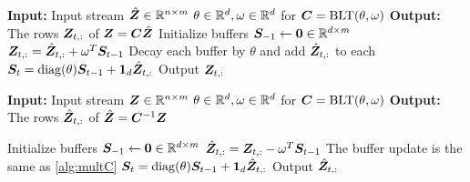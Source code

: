  \begin{minipage}[t]{0.49\textwidth}
\begin{algorithm}[H]
\caption{\small Stream Mult. by $\bltm(\theta, \omega)$~\citep{mcmahan2024efficient}} \label{alg:multC}
\begin{algorithmic}%
\STATE \textbf{Input:} 
\STATE \myind Input stream $\hat {{\bm{Z}}} \in \mathbb{R}^{n \times m}$
\STATE \myind $\theta \in \mathbb{R}^d, \omega \in \mathbb{R}^d$ for ${\bm{C}} = \text{BLT}(\theta, \omega)$
\STATE \textbf{Output:}
\STATE \myind The rows ${\bm{Z}}_{t, :}$ of ${\bm{Z}} = {\bm{C}} \hat {{\bm{Z}}}$
\STATE
\STATE Initialize buffers ${\bm{S}}_{-1} \leftarrow \mathbf{0} \in \mathbb{R}^{d \times m}$
  \STATE  ${\bm{Z}}_{t,:} = \hat{{\bm{Z}}}_{t,:} + \omega^T {\bm{S}}_{t-1}$ 
  \STATEComment Decay each buffer by $\theta$ and add $\hat{{\bm{Z}}}_{t,:}$ to each
  \STATE ${\bm{S}}_{t} = \operatorname{diag}(\theta) {\bm{S}}_{t-1}  + \bm{1}_d \hat{{\bm{Z}}}_{t,:}$
  \STATE Output ${\bm{Z}}_{t,:}$
\ENDFOR
\end{algorithmic}
\end{algorithm}
\end{minipage}
%
\hfill
%
\begin{minipage}[t]{0.49\textwidth}
\begin{algorithm}[H]
\caption{\small Stream Mult. by $\bltm^{-1}(\theta, \omega)$} \label{alg:multCinv}
\begin{algorithmic}%
\STATE \textbf{Input:} 
\STATE \myind Input stream ${\bm{Z}} \in \mathbb{R}^{n \times m}$
\STATE \myind $\theta \in \mathbb{R}^d, \omega \in \mathbb{R}^d$ for ${\bm{C}} = \text{BLT}(\theta, \omega)$
\STATE \textbf{Output:}
\STATE \myind The rows $\hat {{\bm{Z}}}_{t, :}$ of $\hat {{\bm{Z}}} = {\bm{C}}^{-1} {\bm{Z}}$

\STATE
\STATE Initialize buffers ${\bm{S}}_{-1} \leftarrow \mathbf{0} \in \mathbb{R}^{d \times m}$
  \STATE $\hat{{\bm{Z}}}_{t,:}  = {\bm{Z}}_{t,:} - \omega^T {\bm{S}}_{t-1}$
  \STATEComment The buffer update is the same as \cref{alg:multC}
  \STATE $  {\bm{S}}_{t} = \operatorname{diag}(\theta) {\bm{S}}_{t-1}  + \bm{1}_d \hat{{\bm{Z}}}_{t,:}$
  \STATE Output $\hat {{\bm{Z}}}_{t, :}$
\ENDFOR
\end{algorithmic}
\end{algorithm}
\end{minipage}